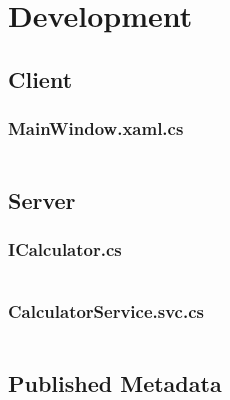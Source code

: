 \chapter{Development}
\section{Client}

	\subsection{MainWindow.xaml.cs}
	\inputminted[linenos=true,fontsize=\footnotesize,tabsize=2]{csharp}{../CalculatorService/CalculatorClient/MainWindow.xaml.cs}
	
	\newpage

\section{Server}
	
	\subsection{ICalculator.cs}
	\inputminted[linenos=true,fontsize=\footnotesize,tabsize=2]{csharp}{../CalculatorService/CalculatorService/ICalculator.cs}
	
	\newpage
	
	\subsection{CalculatorService.svc.cs}
	\inputminted[linenos=true,fontsize=\scriptsize,tabsize=2]{csharp}{../CalculatorService/CalculatorService/CalculatorService.svc.cs}
	
	\newpage

\section{Published Metadata}

